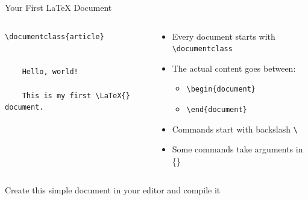\begin{frame}[fragile]{Your First LaTeX Document}
    \begin{columns}
        \begin{column}{0.5\textwidth}
\begin{lstlisting}
\documentclass{article}


    Hello, world!
    
    This is my first \LaTeX{} document.

\end{lstlisting}
        \end{column}
        
        \begin{column}{0.5\textwidth}
            \begin{itemize}
                \item Every document starts with \texttt{\textbackslash documentclass}
                \item The actual content goes between:
                \begin{itemize}
                    \item \texttt{\textbackslash begin\{document\}}
                    \item \texttt{\textbackslash end\{document\}}
                \end{itemize}
                \item Commands start with backslash \texttt{\textbackslash}
                \item Some commands take arguments in \{\}
            \end{itemize}
        \end{column}
    \end{columns}
    
    \begin{practice}
        Create this simple document in your editor and compile it
    \end{practice}
\end{frame}

